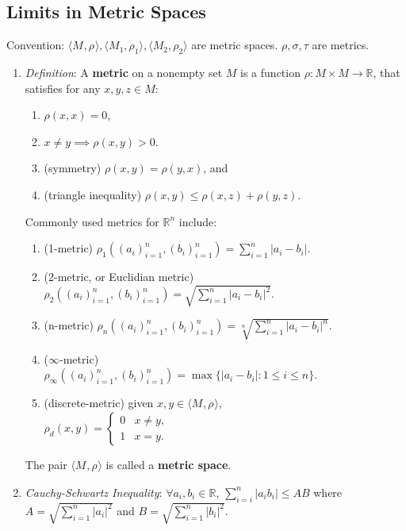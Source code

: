 \documentclass[10pt]{article}
\newcommand{\real}{\mathbb{R}}
\newcommand{\met}[1]{\langle M_{#1},\rho_{#1}\rangle}
\begin{document}
\begin{multicols*}{3}
	\section{Limits in Metric Spaces}
	Convention: $\met{}, \met{1}, \met{2}$ are metric spaces. $\rho, \sigma, \tau$
	are metrics.
	\begin{enumerate}
		\item \emph{Definition}: A \textbf{metric} on a nonempty set $M$ is a
			function $\rho:M\times M\to\real$, that satisfies for any $x,y,z\in M$:
			\begin{enumerate}
				\item $\rho(x,x)=0$,
				\item $x\neq y\implies\rho(x,y)>0$.
				\item (symmetry) $\rho(x,y)=\rho(y,x)$, and
				\item (triangle inequality) $\rho(x,y)\leq\rho(x,z)+\rho(y,z)$.
			\end{enumerate}
			Commonly used metrics for $\real^{n}$ include:
			\begin{enumerate}
				\item (1-metric)
					$\rho_{1}((a_{i})^{n}_{i=1},(b_{i})^{n}_{i=1})=\sum\limits^{n}_{i=1}|a_{i}-b_{i}|$.
				\item (2-metric, or Euclidian metric)\\
					$\rho_{2}((a_{i})^{n}_{i=1},(b_{i})^{n}_{i=1})=\sqrt{\sum\limits^{n}_{i=1}|a_{i}-b_{i}|^{2}}$.
				\item (n-metric)
					$\rho_{n}((a_{i})^{n}_{i=1},(b_{i})^{n}_{i=1})=\sqrt[n]{\sum\limits^{n}_{i=1}|a_{i}-b_{i}|^{n}}$.
				\item ($\infty$-metric)\\
					$\rho_{\infty}((a_{i})^{n}_{i=1},(b_{i})^{n}_{i=1})=\max\{|a_{i}-b_{i}|:1\leq i\leq n\}$.
				\item (discrete-metric) given $x,y\in\met{},$\\
					$\rho_{d}(x,y)= \begin{cases} 0 & x\neq y,\\ 1 & x=y. \end{cases}$

			\end{enumerate}
			The pair $\met{}$ is called a \textbf{metric space}.

		\item \emph{Cauchy-Schwartz Inequality}: $\forall a_{i},b_{i}\in\real$,
			$\sum\limits_{i=i}^{n}|a_{i}b_{i}|\leq AB$ where
			$A=\sqrt{\sum\limits_{i=1}^{n}|a_{i}|^{2}}$ and $B=\sqrt{\sum\limits_{i=1}^{n}|b_{i}|^{2}}$.


\end{enumerate}
\end{multicols*}
\end{document}
